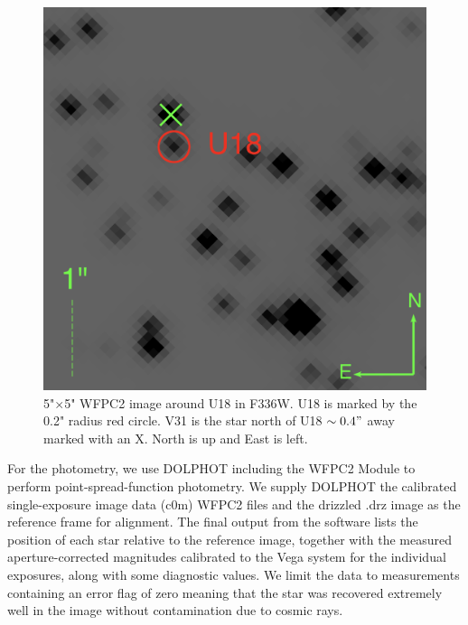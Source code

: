 \documentclass[fleqn,usenatbib,useAMS,letters]{mnras}
\begin{document}
 \begin{figure}
	\includegraphics[width= 0.9 \columnwidth]{hstds9.png}
    \caption{5"$\times$5" WFPC2 image around U18 in F336W. U18 is marked by the 0.2" radius red circle. V31 is the star north of U18 $\sim 0.4"$ away marked with an X. North is up and East is left.}
    \label{fig:u18}
\end{figure}



 
 For the photometry, we use DOLPHOT \citep{2000PASP..112.1383D} including the WFPC2 Module to perform point-spread-function photometry. We supply DOLPHOT the calibrated single-exposure image data (c0m) WFPC2 files and the drizzled .drz image as the reference frame for alignment. The final output from the software lists the position of each star relative to the reference image, together with the measured aperture-corrected magnitudes calibrated to the Vega system for the individual exposures, along with some diagnostic values. We limit the data to measurements containing an error flag of zero meaning that the star was recovered extremely well in the image without contamination due to cosmic rays.
\end{document}
